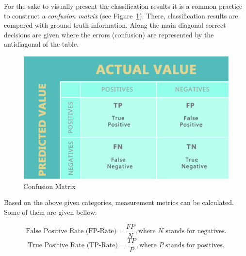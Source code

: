 For the sake to visually present the classification results it is a common practice to construct a \textit{confusion matrix} (see Figure~\ref{fig:confusion-matrix}). There,  classification results are compared with ground truth information. Along the main diagonal correct decisions are given where the errors (confusion) are represented by the antidiagonal of the table.

\begin{figure}[h!]
    \centering
    \includegraphics[scale=0.33]{Graphics/confusion-matrix.png}
    \caption{Confusion Matrix}
    \label{fig:confusion-matrix}
\end{figure}


Based on the above given categories, measurement metrics can be calculated. Some of them are given bellow:

\[ \textrm{False Positive Rate (FP-Rate)} = \frac{FP}{N}, \textrm{where } N \textrm{ stands for negatives.}  \]
\[ \textrm{True Positive Rate (TP-Rate)} = \frac{TP}{P}, \textrm{where } P \textrm{ stands for positives.}  \]


